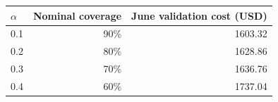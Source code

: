 \begin{tabular}{lrr}
\toprule
$\alpha$ & Nominal coverage & June validation cost (USD) \\
\midrule
0.1 & 90\% & 1603.32 \\
0.2 & 80\% & 1628.86 \\
0.3 & 70\% & 1636.76 \\
0.4 & 60\% & 1737.04 \\
\bottomrule
\end{tabular}
